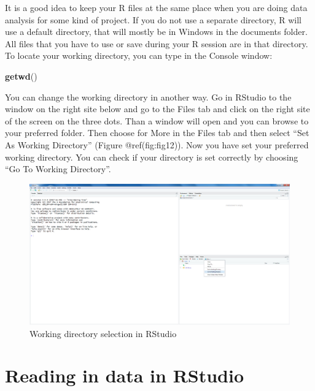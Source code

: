 \documentclass[
]{book}
\newenvironment{Shaded}{\begin{snugshade}}{\end{snugshade}}
\newcommand{\KeywordTok}[1]{\textcolor[rgb]{0.13,0.29,0.53}{\textbf{#1}}}
\newcommand{\NormalTok}[1]{#1}
\begin{document}
It is a good idea to keep your R files at the same place when you are
doing data analysis for some kind of project. If you do not use a
separate directory, R will use a default directory, that will mostly be
in Windows in the documents folder. All files that you have to use or
save during your R session are in that directory. To locate your working
directory, you can type in the Console window:

\begin{Shaded}
\begin{Highlighting}[]
\KeywordTok{getwd}\NormalTok{()}
\end{Highlighting}
\end{Shaded}

You can change the working directory in another way. Go in RStudio to
the window on the right site below and go to the Files tab and click on
the right site of the screen on the three dots. Than a window will open
and you can browse to your preferred folder. Then choose for More in the
Files tab and then select ``Set As Working Directory'' (Figure
@ref(fig:fig12)). Now you have set your preferred working directory. You
can check if your directory is set correctly by choosing ``Go To Working
Directory''.

\begin{figure}

{\centering \includegraphics[width=0.95\linewidth]{images/fig1.12} 

}

\caption{Working directory selection in RStudio}\label{fig:fig12}
\end{figure}

\hypertarget{reading-in-data-in-rstudio}{%
\section{Reading in data in RStudio}\label{reading-in-data-in-rstudio}}
\end{document}
